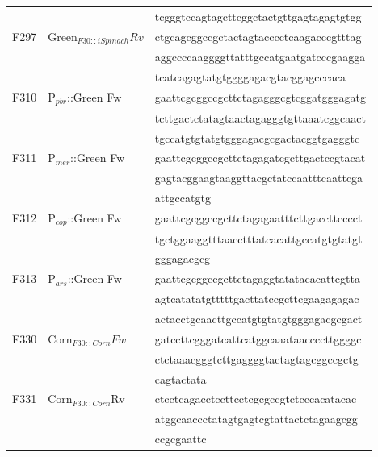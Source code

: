 \begin{table}[ht]
{\begin{tabular*}{\columnwidth}{@{}lll@{}}
\\
&  &  \MakeLowercase{TCGGGTCCAGTAGCTTCGGCTACTGTTGAGTAGAGTGTGG}
\\
F297 & Green$_{F30::iSpinach}Rv$ & \MakeLowercase{ctgcagcggccgctactagtaCCCCTCAAGACCCGTTTAG}
\\
&  &  \MakeLowercase{AGGCCCCAAGGGGTTATTTGCCATGAATGATCCCGAAGGA}
\\
&  &  \MakeLowercase{TCATCAGAGTATGTGGGGAGACGTACGGAGCCCACA}
\\
F310 & P$_{pbr}$::Green Fw &  \MakeLowercase{GAATTCGCGGCCGCTTCTAGAGGGCGTCGGATGGGAGATG}
\\
&  &  \MakeLowercase{TCTTGACTCTATAGTAACTAGAGGGTGTTAAATCGGCAACT}
\\
&  &  \MakeLowercase{TGCCATGTGTATGTGGGAGACGCGACTACGGTGAGGGTC}
\\
F311 & P$_{mer}$::Green Fw & \MakeLowercase{GAATTCGCGGCCGCTTCTAGAGATCGCTTGACTCCGTACAT}
\\
& & \MakeLowercase{GAGTACGGAAGTAAGGTTACGCTATCCAATTTCAATTCGA}
\\
& & \MakeLowercase{ATTGCCATGTG}
\\
F312 & P$_{cop}$::Green Fw & \MakeLowercase{GAATTCGCGGCCGCTTCTAGAGAATTTCTTGACCTTCCCCT}
\\
& & \MakeLowercase{TGCTGGAAGGTTTAACCTTTATCACATTGCCATGTGTATGT}
\\
& & \MakeLowercase{GGGAGACGCG}
\\
F313 & P$_{ars}$::Green Fw & \MakeLowercase{GAATTCGCGGCCGCTTCTAGAGGTATATACACATTCGTTA}
\\
 &  & \MakeLowercase{AGTCATATATGTTTTTGACTTATCCGCTTCGAAGAGAGAC}
\\
&  & \MakeLowercase{ACTACCTGCAACTTGCCATGTGTATGTGGGAGACGCGACT}
\\
F330 & Corn$_{F30::Corn}Fw$ & \MakeLowercase{GATCCTTCGGGATCATTCATGGCAAATAACCCCTTGGGGC}
\\
& & \MakeLowercase{CTCTAAACGGGTCTTGAGGGGTACTAGTAGCGGCCGCTG}
\\
&& \MakeLowercase{CAGtactata}
\\
F331 & Corn$_{F30::Corn}$Rv & \MakeLowercase{CTCCTCAGACCTCCTTCCTCGCGCcgtctCCCACATACAC}
\\
& & \MakeLowercase{ATGGCAACCCTATAGTGAGTCGTATTACTCTAGaagcgg}
\\
&& \MakeLowercase{ccgcgaattc}
\\
\hline
\end{tabular*}
}{ }
\end{table}

